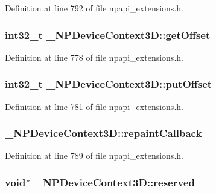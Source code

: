 Definition at line 792 of file npapi\_\-extensions.h.

\hypertarget{struct___n_p_device_context3_d_a94db0e726b7e3e3a421816ac896a8a51}{
\subsubsection[{getOffset}]{\setlength{\rightskip}{0pt plus 5cm}int32\_\-t {\bf \_\-NPDeviceContext3D::getOffset}}}
\label{struct___n_p_device_context3_d_a94db0e726b7e3e3a421816ac896a8a51}


Definition at line 778 of file npapi\_\-extensions.h.

\hypertarget{struct___n_p_device_context3_d_a95a001a05b4eb06f052a747f5521d2df}{
\subsubsection[{putOffset}]{\setlength{\rightskip}{0pt plus 5cm}int32\_\-t {\bf \_\-NPDeviceContext3D::putOffset}}}
\label{struct___n_p_device_context3_d_a95a001a05b4eb06f052a747f5521d2df}


Definition at line 781 of file npapi\_\-extensions.h.

\hypertarget{struct___n_p_device_context3_d_af5ba5d8f7cf171c710986a37dce757c8}{
\subsubsection[{repaintCallback}]{ {\bf \_\-NPDeviceContext3D::repaintCallback}}}
\label{struct___n_p_device_context3_d_af5ba5d8f7cf171c710986a37dce757c8}


Definition at line 789 of file npapi\_\-extensions.h.

\hypertarget{struct___n_p_device_context3_d_a98ffca8489323d94761d36927edbdc3c}{
\subsubsection[{reserved}]{\setlength{\rightskip}{0pt plus 5cm}void$\ast$ {\bf \_\-NPDeviceContext3D::reserved}}}
\label{struct___n_p_device_context3_d_a98ffca8489323d94761d36927edbdc3c}



